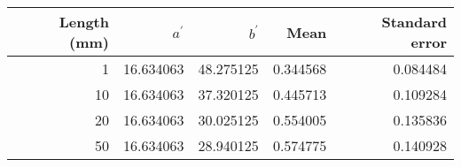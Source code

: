 \begin{tabular}{rrrrr}
\toprule
 Length (mm) &  $a^\prime$ &  $b^\prime$ &      Mean &  Standard error \\
\midrule
           1 &   16.634063 &   48.275125 &  0.344568 &        0.084484 \\
          10 &   16.634063 &   37.320125 &  0.445713 &        0.109284 \\
          20 &   16.634063 &   30.025125 &  0.554005 &        0.135836 \\
          50 &   16.634063 &   28.940125 &  0.574775 &        0.140928 \\
\bottomrule
\end{tabular}
